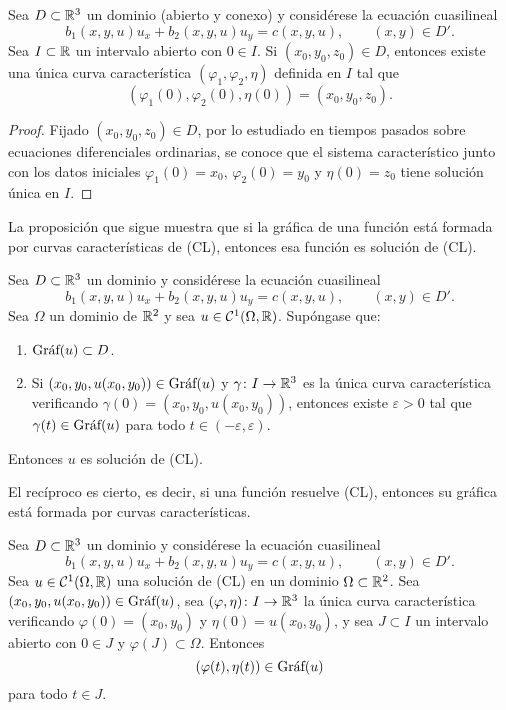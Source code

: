 \documentclass[a4paper, 12pt, extrafontsizes]{memoir}
\begin{document}
\begin{proposition}
Sea $D \subset \R^3$ un dominio (abierto y conexo) y considérese la ecuación cuasilineal
\[b_1(x,y,u)u_x+b_2(x,y,u)u_y = c(x,y,u), \qquad (x,y) \in D'.\]
Sea $I \subset \R$ un intervalo abierto con $0 \in I$. Si $(x_0,y_0,z_0) \in D$, entonces existe una única curva característica $(\varphi_1,\varphi_2,\eta)$ definida en $I$ tal que
\[(\varphi_1(0),\varphi_2(0),\eta(0)) = (x_0,y_0,z_0).\]
\end{proposition}

\begin{proof}
    Fijado $(x_0,y_0,z_0) \in D$, por lo estudiado en tiempos pasados sobre ecuaciones diferenciales ordinarias, se conoce que el sistema característico junto con los datos iniciales $\varphi_1(0)=x_0$, $\varphi_2(0)=y_0$ y $\eta(0)=z_0$ tiene solución única en $I$.
\end{proof}

La proposición que sigue muestra que si la gráfica de una función está formada por curvas características de (CL), entonces esa función es solución de (CL). 

\begin{proposition}\label{pro:2.1.4}
    Sea $D \subset \R^3$ un dominio y considérese la ecuación cuasilineal
    \[b_1(x,y,u)u_x+b_2(x,y,u)u_y = c(x,y,u), \qquad (x,y) \in D'.\]
    Sea $\Omega$ un dominio de $\R^2$ y sea $u \in \mathcal{C}^1(\Omega,\R)$. Supóngase que:
    \begin{enumerate}
        \item $\Graf{u} \subset D$.
        \item Si $(x_0,y_0,u(x_0,y_0)) \in \Graf{u}$ y $\gamma \colon I \to \R^3$ es la única curva característica verificando $\gamma(0)=(x_0,y_0,u(x_0,y_0))$, entonces existe $\varepsilon > 0$ tal que $\gamma(t) \in \Graf{u}$ para todo $t \in (-\varepsilon,\varepsilon)$.
    \end{enumerate}
    Entonces $u$ es solución de \textup{(CL)}.
\end{proposition}

El recíproco es cierto, es decir, si una función resuelve (CL), entonces su gráfica está formada por curvas características.

\begin{proposition}
    Sea $D \subset \R^3$ un dominio y considérese la ecuación cuasilineal
    \[b_1(x,y,u)u_x+b_2(x,y,u)u_y = c(x,y,u), \qquad (x,y) \in D'.\]
    Sea $u \in \mathcal{C}^1(\Omega,\R)$ una solución de \textup{(CL)} en un dominio $\Omega \subset \R^2$. Sea $(x_0,y_0,u(x_0,y_0)) \in \Graf{u}$, sea $(\varphi,\eta) \colon I \to \R^3$ la única curva característica verificando $\varphi(0) = (x_0,y_0) $ y $\eta(0)=u(x_0,y_0)$, y sea $J \subset I$ un intervalo abierto con $0 \in J$ y $\varphi(J) \subset \Omega$. Entonces \[(\varphi(t),\eta(t)) \in \Graf{u}\] para todo $t \in J$.
\end{proposition}
\end{document}
